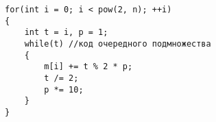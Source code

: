 \documentclass{article}
\begin{document}
\lstset{language = C, extendedchars = \true, keepspaces = true}
\begin{lstlisting}
for(int i = 0; i < pow(2, n); ++i)
{
	int t = i, p = 1;
	while(t) //код очередного подмножества
	{
		m[i] += t % 2 * p;
		t /= 2;
		p *= 10;
	}
}
\end{lstlisting}
\end{document}
